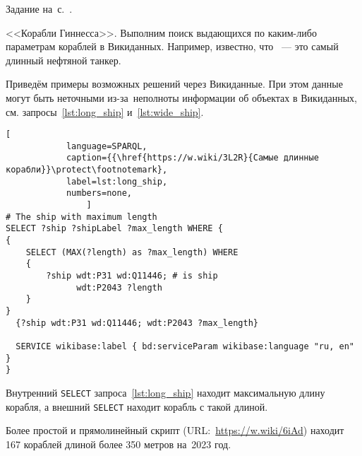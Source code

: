 \hfil{}\hfil%
\newpage

\begin{task}
    \label{answer:ship_Guinness}
    \AnswerBackref Задание на~с.~\pageref{question:ship_Guinness}.

    <<Корабли Гиннесса>>. 
    Выполним поиск выдающихся по каким-либо параметрам кораблей в Викиданных.
    Например, известно, что ~--- это самый длинный нефтяной танкер.

    Приведём примеры возможных решений через Викиданные. 
    При этом данные могут быть неточными из-за~неполноты информации об объектах в Викиданных, 
    см. запросы~\ref{lst:long_ship} и~\ref{lst:wide_ship}.

\begin{lstlisting}[ 
            language=SPARQL, 
            caption={{\href{https://w.wiki/3L2R}{Самые длинные корабли}}\protect\footnotemark}, 
            label=lst:long_ship,
            numbers=none,
                ]
# The ship with maximum length
SELECT ?ship ?shipLabel ?max_length WHERE {
{
    SELECT (MAX(?length) as ?max_length) WHERE
    {
        ?ship wdt:P31 wd:Q11446; # is ship
              wdt:P2043 ?length
    }
}
  {?ship wdt:P31 wd:Q11446; wdt:P2043 ?max_length}
		
  SERVICE wikibase:label { bd:serviceParam wikibase:language "ru, en" }
}
\end{lstlisting}

Внутренний \lstinline|SELECT| запроса~\ref{lst:long_ship} находит максимальную длину корабля, 
а внешний \lstinline|SELECT| находит корабль с такой длиной. 

Более простой и прямолинейный скрипт (URL:~\href{https://w.wiki/6iAd}{https://w.wiki/6iAd}) 
находит 167 кораблей длиной более 350 метров на~2023 год. 





\end{task}
